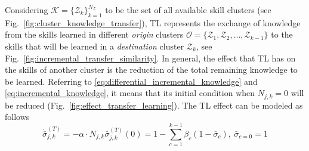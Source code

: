 Considering $\mathcal{K} = \{ \mathcal{Z}_k \}^{N_\mathcal{Z}}_{k=1}$ to be the set of all available skill clusters (see Fig.~\ref{fig:cluster_knowledge_transfer}), TL represents the exchange of knowledge from the skills learned in different \emph{origin} clusters $\mathcal{O} = \{ \mathcal{Z}_1,\mathcal{Z}_2,\ldots,\mathcal{Z}_{k-1} \}$ to the skills that will be learned in a \emph{destination} cluster $\mathcal{Z}_k$, see Fig.~\ref{fig:incremental_transfer_similarity}. In general, the effect that TL has on the skills of another cluster is the reduction of the total remaining knowledge to be learned. Referring to \eqref{eq:differential_incremental_knowledge} and \eqref{eq:incremental_knowledge}, it means that its initial condition when $N_{j,k} = 0$ will be reduced (Fig.~\ref{fig:effect_transfer_learning}). The TL effect can be modeled as follows
\begin{subequations}\label{eq:joint_cartesian_acceleration}
	\begin{equation}\label{eq:joint_cartesian_acceleration_child}
		\dot{\bar{\sigma}}^{(T)}_{j,k} = -\alpha  \cdot N_{j,k}
	\end{equation}    
	\begin{equation}\label{eq:joint_cartesian_acceleration_parent}
		\bar{\sigma}^{(T)}_{j,k}(0) = 1 - \sum\limits_{c = 1}^{k-1}\beta_{c} \left( 1 - \bar{\sigma}_{c} \right),~\bar{\sigma}_{c=0} = 1
	\end{equation}
\end{subequations}
